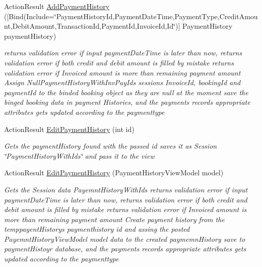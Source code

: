 \begin{DoxyCompactItemize}
Action\+Result \hyperlink{class_alfa_accounting_1_1_controllers_1_1_booking_view_models_controller_a2dd3ff554a0b0a99340572129dc87035}{Add\+Payment\+History} (\mbox{[}Bind(Include=\char`\"{}Payment\+History\+Id,Payment\+Date\+Time,Payment\+Type,Credit\+Amount,Debit\+Amount,Transaction\+Id,Payment\+Id,Invoice\+Id,Id\char`\"{})\mbox{]} Payment\+History payment\+History)
\begin{DoxyCompactList}\small\item\em returns validation error if input payment\+Date\+Time is later than now, returns validation error if both credit and debit amount is filled by mistake returns validation error if Invoiced amount is more than remaining payment amount Assign Null\+Payment\+History\+With\+Inv\+Pay\+Ids session\textquotesingle{}s Invoice\+Id, booking\+Id and payment\+Id to the binded booking object as they are null at the moment save the binged booking data in payment Histories, and the payments record\textquotesingle{}s appropriate attributes gets updated according to the paymenttype \end{DoxyCompactList}\item 
Action\+Result \hyperlink{class_alfa_accounting_1_1_controllers_1_1_booking_view_models_controller_a0dbca25c3000615589dd5f52b9d0df7b}{Edit\+Payment\+History} (int id)
\begin{DoxyCompactList}\small\item\em Gets the payment\+History found with the passed id saves it as Session \char`\"{}\+Payment\+History\+With\+Ids\char`\"{} and pass it to the view \end{DoxyCompactList}\item 
Action\+Result \hyperlink{class_alfa_accounting_1_1_controllers_1_1_booking_view_models_controller_a5f9d68347caac3e53ab18b4afb468a24}{Edit\+Payment\+History} (Payment\+History\+View\+Model model)
\begin{DoxyCompactList}\small\item\em Gets the Session data Payemnt\+History\+With\+Ids returns validation error if input payment\+Date\+Time is later than now, returns validation error if both credit and debit amount is filled by mistake returns validation error if Invoiced amount is more than remaining payment amount Create payment history from the temppayent\+History\textquotesingle{}s paymenthistory id and assing the posted Payemnt\+History\+View\+Model model data to the created paymemn\+History save to payment\+Histoyr database, and the payments record\textquotesingle{}s appropriate attributes gets updated according to the paymenttype \end{DoxyCompactList}\item 

\end{DoxyCompactItemize}

